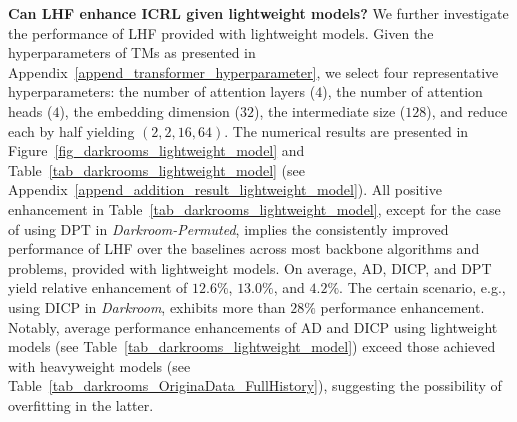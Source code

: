 \documentclass{article}
\begin{document}




\textbf{Can LHF enhance ICRL given lightweight models?}
%
We further investigate the performance of LHF provided with lightweight models. 
%
Given the hyperparameters of TMs as presented in Appendix~\ref{append_transformer_hyperparameter}, we select four representative hyperparameters: the number of attention layers ($4$), the number of attention heads ($4$), the embedding dimension ($32$), the intermediate size ($128$), and reduce each by half yielding $(2, 2, 16, 64)$.
%
The numerical results are presented in Figure~\ref{fig_darkrooms_lightweight_model} and Table~\ref{tab_darkrooms_lightweight_model} (see Appendix~\ref{append_addition_result_lightweight_model}).
%
All positive enhancement in Table~\ref{tab_darkrooms_lightweight_model}, except for the case of using DPT in \textit{Darkroom-Permuted}, implies the consistently improved performance of LHF over the baselines across most backbone algorithms and problems, provided with lightweight models.
%
On average, AD, DICP, and DPT yield relative enhancement of $12.6\%$, $13.0\%$, and $4.2\%$. The certain scenario, e.g., using DICP in \textit{Darkroom}, exhibits more than $28\%$ performance enhancement. Notably, average performance enhancements of AD and DICP using lightweight models (see Table~\ref{tab_darkrooms_lightweight_model}) exceed those achieved with heavyweight models (see Table~\ref{tab_darkrooms_OriginaData_FullHistory}), suggesting the possibility of overfitting in the latter.
\end{document}
